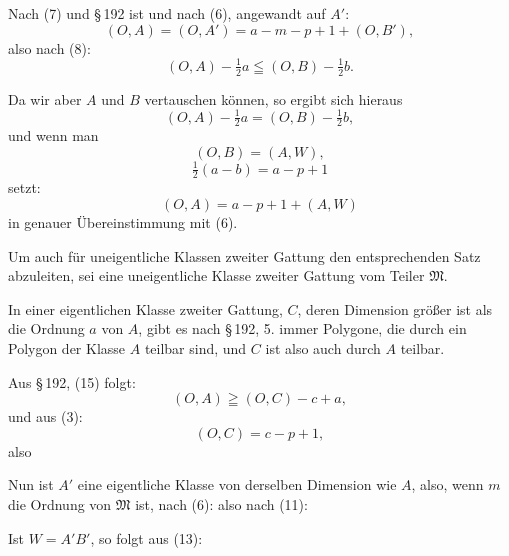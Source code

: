 Nach (7) und \S\,192 ist
und nach (6), angewandt auf $A'$:
\[
(O, A) = (O, A') = a - m - p + 1 + (O, B'),
\]
also nach (8):
\[
(O, A) - \tfrac{1}{2} a \leqq (O, B) - \tfrac{1}{2} b.
\]

Da wir aber $A$ und $B$ vertauschen können, so ergibt sich
hieraus
\[
(O, A) - \tfrac{1}{2} a = (O, B) - \tfrac{1}{2} b,
\]
und wenn man
\[
(O, B) = (A, W),
\]
\[
\tfrac{1}{2}(a - b) = a - p + 1
\]
setzt:
\[
(O, A) = a - p + 1 + (A, W)
\]
in genauer Übereinstimmung mit (6).

Um auch für uneigentliche Klassen zweiter Gattung den
entsprechenden Satz abzuleiten, sei
eine uneigentliche Klasse zweiter Gattung vom Teiler $\mathfrak{M}$.

In einer eigentlichen Klasse zweiter Gattung, $C$, deren
Dimension größer ist als die Ordnung $a$ von $A$, gibt es nach
\S\,192, 5. immer Polygone, die durch ein Polygon der Klasse $A$
teilbar sind, und $C$ ist also auch durch $A$ teilbar.

Aus \S\,192, (15) folgt:
\[
(O, A) \geqq (O, C) - c + a,
\]
und aus (3):
\[
(O, C) = c - p + 1,
\]
also

Nun ist $A'$ eine eigentliche Klasse von derselben Dimension
wie $A$, also, wenn $m$ die Ordnung von $\mathfrak{M}$ ist, nach (6):
also nach (11):


Ist $W = A'B'$, so folgt aus (13):

